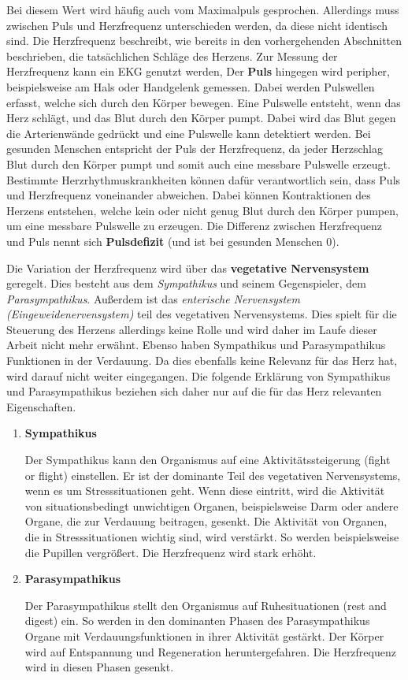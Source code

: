 Bei diesem Wert wird häufig auch vom Maximalpuls gesprochen. Allerdings muss zwischen Puls und Herzfrequenz unterschieden werden, da diese nicht identisch sind. 
Die Herzfrequenz beschreibt, wie bereits in den vorhergehenden Abschnitten beschrieben, die tatsächlichen Schläge des Herzens. Zur Messung der Herzfrequenz kann ein \ac{EKG} genutzt werden,
Der \textbf{Puls} hingegen wird peripher, beispielsweise am Hals oder Handgelenk gemessen. Dabei werden Pulswellen erfasst, welche sich durch den Körper bewegen. Eine Pulswelle entsteht, wenn das Herz schlägt, und das Blut durch den Körper pumpt. Dabei wird das Blut gegen die Arterienwände gedrückt und eine Pulswelle kann detektiert werden.
Bei gesunden Menschen entspricht der Puls der Herzfrequenz, da jeder Herzschlag Blut durch den Körper pumpt und somit auch eine messbare Pulswelle erzeugt. Bestimmte Herzrhythmuskrankheiten können dafür verantwortlich sein, dass Puls und Herzfrequenz voneinander abweichen. Dabei können Kontraktionen des Herzens entstehen, welche kein oder nicht genug Blut durch den Körper pumpen, um eine messbare Pulswelle zu erzeugen. Die Differenz zwischen Herzfrequenz und Puls nennt sich \textbf{Pulsdefizit} (und ist bei gesunden Menschen 0). \cite{babilon}

Die Variation der Herzfrequenz wird über das \textbf{vegetative Nervensystem} geregelt. Dies besteht aus dem \textit{Sympathikus} und seinem Gegenspieler, dem \textit{Parasympathikus}. Außerdem ist das \textit{enterische Nervensystem (Eingeweidenervensystem)} teil des vegetativen Nervensystems. Dies spielt für die Steuerung des Herzens allerdings keine Rolle und wird daher im Laufe dieser Arbeit nicht mehr erwähnt. Ebenso haben Sympathikus und Parasympathikus Funktionen in der Verdauung. Da dies ebenfalls keine Relevanz für das Herz hat, wird darauf nicht weiter eingegangen. Die folgende Erklärung von Sympathikus und Parasympathikus beziehen sich daher nur auf die für das Herz relevanten Eigenschaften.\cite{veg}

\begin{enumerate}
	\item \textbf{Sympathikus} 
	
	Der Sympathikus kann den Organismus auf eine Aktivitätssteigerung (\glqq fight or flight\grqq{}) einstellen. Er ist der dominante Teil des vegetativen Nervensystems, wenn es um Stresssituationen geht. Wenn diese eintritt, wird die Aktivität von situationsbedingt unwichtigen Organen, beispielsweise Darm oder andere Organe, die zur Verdauung beitragen, gesenkt. 
	Die Aktivität von Organen, die in Stresssituationen wichtig sind, wird verstärkt. So werden beispielsweise die Pupillen vergrößert.
Die Herzfrequenz wird stark erhöht.\cite{sym}	
	
	\item \textbf{Parasympathikus}
	
	Der Parasympathikus stellt den Organismus auf Ruhesituationen (\glqq rest and digest\grqq{}) ein. So werden in den dominanten Phasen des Parasympathikus Organe mit Verdauungsfunktionen in ihrer Aktivität gestärkt. Der Körper wird auf Entspannung und Regeneration heruntergefahren. 
	Die Herzfrequenz wird in diesen Phasen gesenkt.\cite{para}
\end{enumerate}

